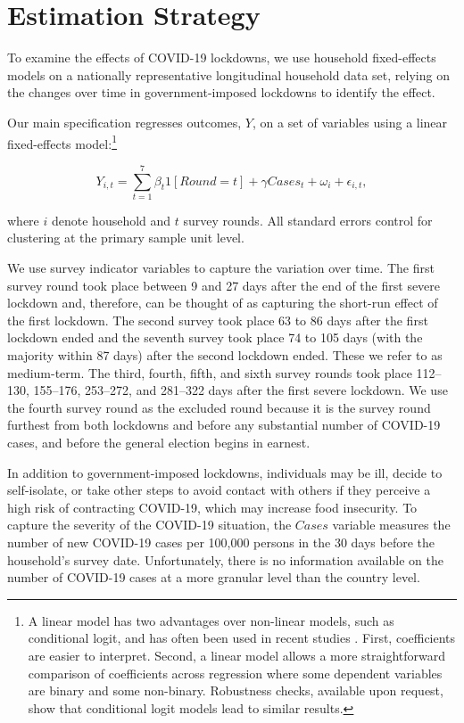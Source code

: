 \documentclass{wber}
\begin{document}
\section{Estimation Strategy}\label{estimation-strategy}

To examine the effects of COVID-19 lockdowns, we use household
fixed-effects models on a nationally representative longitudinal
household data set, relying on the changes over time in
government-imposed lockdowns to identify the effect.

Our main specification regresses outcomes, \(Y\), on a set of variables
using a linear fixed-effects model:\footnote{A linear model has two
  advantages over non-linear models, such as conditional logit, and has
  often been used in recent studies
  \citep{Alam2020, Alam2018, Charles2008}. First, coefficients are
  easier to interpret. Second, a linear model allows a more
  straightforward comparison of coefficients across regression where
  some dependent variables are binary and some non-binary. Robustness
  checks, available upon request, show that conditional logit models
  lead to similar results.}

\[
Y_{i,t} =  \sum_{t=1}^7 \beta_t 1[Round = t]  + \gamma Cases_{t} 
+ \omega_i + \epsilon_{i,t}, 
\]

where \(i\) denote household and \(t\) survey rounds. All standard
errors control for clustering at the primary sample unit level.

We use survey indicator variables to capture the variation over time.
The first survey round took place between 9 and 27 days after the end of
the first severe lockdown and, therefore, can be thought of as capturing
the short-run effect of the first lockdown. The second survey took place
63 to 86 days after the first lockdown ended and the seventh survey took
place 74 to 105 days (with the majority within 87 days) after the second
lockdown ended. These we refer to as medium-term. The third, fourth,
fifth, and sixth survey rounds took place 112--130, 155--176, 253--272,
and 281--322 days after the first severe lockdown. We use the fourth
survey round as the excluded round because it is the survey round
furthest from both lockdowns and before any substantial number of
COVID-19 cases, and before the general election begins in earnest.

In addition to government-imposed lockdowns, individuals may be ill,
decide to self-isolate, or take other steps to avoid contact with others
if they perceive a high risk of contracting COVID-19, which may increase
food insecurity. To capture the severity of the COVID-19 situation, the
\(Cases\) variable measures the number of new COVID-19 cases per 100,000
persons in the 30 days before the household's survey date.
Unfortunately, there is no information available on the number of
COVID-19 cases at a more granular level than the country level.
\end{document}
